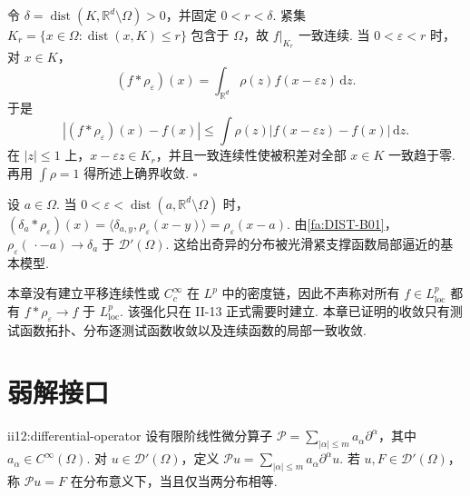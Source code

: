 \begin{FAProof}
令 \(\displaystyle\delta=\operatorname{dist}(K,\mathbb R^d\setminus\Omega)>0\)，并固定 \(\displaystyle0<r<\delta\). 紧集 \(\displaystyle K_r = \{x\in\Omega:\operatorname{dist}(x,K)\leqslant r\}\)
包含于 \(\displaystyle\Omega\)，故 \(\displaystyle f|_{K_r}\) 一致连续. 当 \(\displaystyle0<\varepsilon<r\) 时，对 \(\displaystyle x\in K\)，
\[
(f*\rho_\varepsilon)(x)
=
\int_{\mathbb R^d}\rho(z)f(x-\varepsilon z)\,\mathrm{d}z.
\]
于是
\[
|(f*\rho_\varepsilon)(x)-f(x)|
\leqslant
\int\rho(z)|f(x-\varepsilon z)-f(x)|\,\mathrm{d}z.
\]
在 \(\displaystyle|z|\leqslant1\) 上，\(\displaystyle x-\varepsilon z\in K_r\)，并且一致连续性使被积差对全部 \(\displaystyle x\in K\) 一致趋于零. 再用 \(\displaystyle\int\rho=1\) 得所述上确界收敛.
\hfill\(\square\)
\end{FAProof}

\begin{FAExample}[Dirac的标准正则化]
设 \(\displaystyle a\in\Omega\). 当 \(\displaystyle0<\varepsilon<\operatorname{dist}(a,\mathbb R^d\setminus\Omega)\) 时， \(\displaystyle (\delta_a*\rho_\varepsilon)(x) = \langle\delta_{a,y},\rho_\varepsilon(x-y)\rangle = \rho_\varepsilon(x-a).\)
由\autoref{fa:DIST-B01}， \(\displaystyle \rho_\varepsilon(\,\cdot-a) \longrightarrow \delta_a \;\text{于 }\mathcal D'(\Omega).\)
这给出奇异的分布被光滑紧支撑函数局部逼近的基本模型.
\end{FAExample}

\begin{FAWarning}
本章没有建立平移连续性或 \(\displaystyle C_c^\infty\) 在 \(\displaystyle L^p\) 中的密度链，因此不声称对所有 \(\displaystyle f\in L^p_{\mathrm{loc}}\) 都有 \(\displaystyle f*\rho_\varepsilon\to f\) 于 \(\displaystyle L^p_{\mathrm{loc}}\). 该强化只在 II-13 正式需要时建立. 本章已证明的收敛只有测试函数拓扑、分布逐测试函数收敛以及连续函数的局部一致收敛.
\end{FAWarning}

\section{弱解接口}\label{sec:ii12-weak-interface}

\begin{FADefinition}[B][光滑系数微分算子在分布上的作用]{ii12:differential-operator}
设有限阶线性微分算子 \(\displaystyle \mathcal P=\sum_{|\alpha|\leqslant m}a_\alpha\partial^\alpha\)，其中 \(\displaystyle a_\alpha\in C^\infty(\Omega)\). 对 \(\displaystyle u\in\mathcal D'(\Omega)\)，定义 \(\displaystyle \mathcal Pu=\sum_{|\alpha|\leqslant m}a_\alpha\partial^\alpha u\). 若 \(\displaystyle u,F\in\mathcal D'(\Omega)\)，称 \(\displaystyle\mathcal Pu=F\) 在分布意义下，当且仅当两分布相等.
\end{FADefinition}


